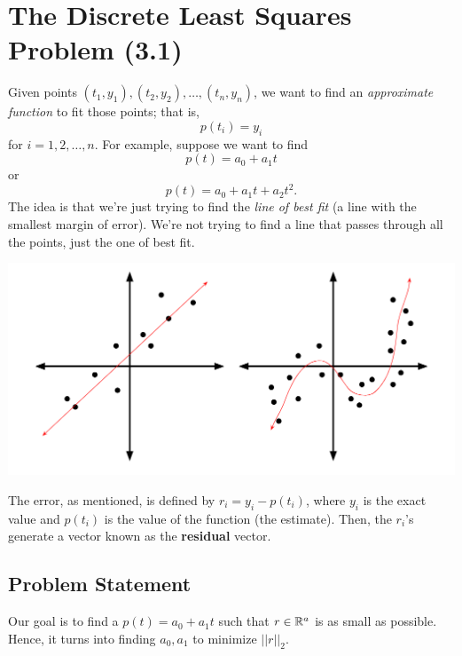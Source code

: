 \documentclass[letterpaper]{article}
\newcommand{\0}{\mathbf{0}}
\begin{document}
\section{The Discrete Least Squares Problem (3.1)}
Given points $(t_1, y_1), (t_2, y_2), \hdots, (t_n, y_n)$, we want to find an \emph{approximate function} to fit those points; that is, \[p(t_i) = y_i\] for $i = 1, 2, \hdots, n$. For example, suppose we want to find \[p(t) = a_0 + a_1 t\] or \[p(t) = a_0 + a_1 t + a_2 t^2.\] The idea is that we're just trying to find the \emph{line of best fit} (a line with the smallest margin of error). We're not trying to find a line that passes through all the points, just the one of best fit.
\begin{center}
    \includegraphics[scale=0.7]{../assets/line_best_fit.png}
\end{center}
The error, as mentioned, is defined by $r_i = y_i - p(t_i)$, where $y_i$ is the exact value and $p(t_i)$ is the value of the function (the estimate). Then, the $r_i$'s generate a vector known as the \textbf{residual} vector.

\subsection{Problem Statement}
Our goal is to find a $p(t) = a_0 + a_1 t$ such that $r \in \mathbb{R}^a$ is as small as possible. Hence, it turns into finding $a_0, a_1$ to minimize $||r||_2$. 
\end{document}

